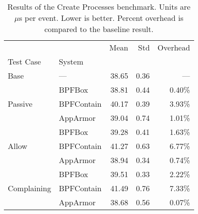 \begin{table}[ht!]
\centering
\footnotesize
\caption[Results of the Create Processes benchmark]{Results of the Create Processes benchmark. Units are $\mu$s per event. Lower is better. Percent overhead is compared to the baseline result.}
\label{tab:phoronix-create-processes}
\begin{tabular}{llrrr}
\toprule
            &          &   Mean &   Std & Overhead \\
Test Case & System &        &       &          \\
\midrule
Base & --- &  38.65 &  0.36 &      --- \\
\cline{1-5}
\multirow{3}{*}{Passive} & BPFBox &  38.81 &  0.44 &   0.40\% \\
            & BPFContain &  40.17 &  0.39 &   3.93\% \\
            & AppArmor &  39.04 &  0.74 &   1.01\% \\
\cline{1-5}
\multirow{3}{*}{Allow} & BPFBox &  39.28 &  0.41 &   1.63\% \\
            & BPFContain &  41.27 &  0.63 &   6.77\% \\
            & AppArmor &  38.94 &  0.34 &   0.74\% \\
\cline{1-5}
\multirow{3}{*}{Complaining} & BPFBox &  39.51 &  0.33 &   2.22\% \\
            & BPFContain &  41.49 &  0.76 &   7.33\% \\
            & AppArmor &  38.68 &  0.56 &   0.07\% \\
\bottomrule
\end{tabular}
\end{table}
